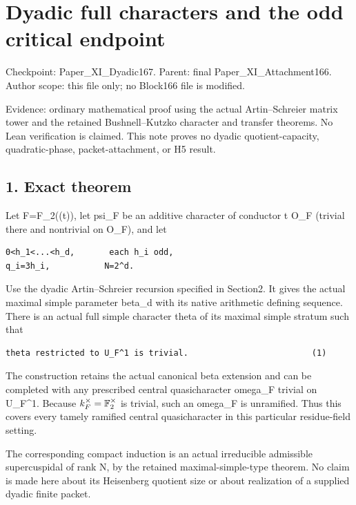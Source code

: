 \clearpage
\section{Dyadic full characters and the odd critical endpoint}\label{app:dyadic_character}

Checkpoint: Paper\_XI\_Dyadic167. Parent: final
Paper\_XI\_Attachment166. Author scope: this file only; no Block166 file
is modified.

Evidence: ordinary mathematical proof using the actual Artin--Schreier
matrix tower and the retained Bushnell--Kutzko character and transfer
theorems. No Lean verification is claimed. This note proves no dyadic
quotient-capacity, quadratic-phase, packet-attachment, or H5 result.

\hypertarget{dyadic_character-exact-theorem}{%
\subsection{1. Exact theorem}\label{dyadic_character-exact-theorem}}

Let F=F\_2((t)), let psi\_F be an additive character of conductor t O\_F
(trivial there and nontrivial on O\_F), and let

\begin{Verbatim}[fontsize=\small,breaklines=true,breakanywhere=true]
0<h_1<...<h_d,       each h_i odd,
q_i=3h_i,           N=2^d.
\end{Verbatim}

Use the dyadic Artin--Schreier recursion specified in Section2. It gives
the actual maximal simple parameter beta\_d with its native arithmetic
defining sequence. There is an actual full simple character theta of its
maximal simple stratum such that

\begin{Verbatim}[fontsize=\small,breaklines=true,breakanywhere=true]
theta restricted to U_F^1 is trivial.                         (1)
\end{Verbatim}

The construction retains the actual canonical beta extension and can be
completed with any prescribed central quasicharacter omega\_F trivial on
U\_F\^{}1. Because \(k_F^\times=\mathbb F_2^\times\) is trivial,
such an omega\_F is unramified. Thus this covers every tamely ramified
central quasicharacter in this particular residue-field setting.

The corresponding compact induction is an actual irreducible admissible
supercuspidal of rank N, by the retained maximal-simple-type theorem. No
claim is made here about its Heisenberg quotient size or about
realization of a supplied dyadic finite packet.

